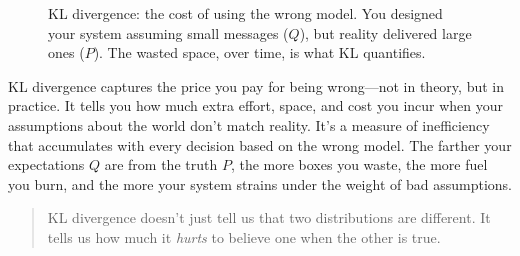 \begin{figure}[H]
\centering
{}
\caption{KL divergence: the cost of using the wrong model. You designed your system assuming small messages (\( Q \)), but reality delivered large ones (\( P \)). The wasted space, over time, is what KL quantifies.}
\end{figure}

\vspace{1em}


KL divergence captures the price you pay for being wrong—not in theory, but in practice. It tells you how much extra effort, space, and cost you incur when your assumptions about the world don’t match reality. It’s a measure of inefficiency that accumulates with every decision based on the wrong model. The farther your expectations \( Q \) are from the truth \( P \), the more boxes you waste, the more fuel you burn, and the more your system strains under the weight of bad assumptions.

\begin{quote}
KL divergence doesn’t just tell us that two distributions are different. It tells us how much it \emph{hurts} to believe one when the other is true.
\end{quote}

